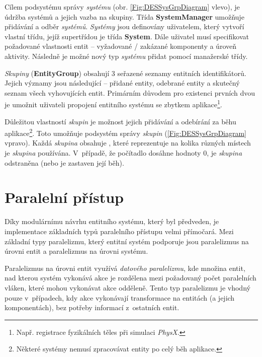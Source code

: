 Cílem podsystému správy \emph{systému} (obr. \ref{Fig:DESSysGrpDiagram} vlevo), je údržba systémů a jejich vazba na skupiny. Třída \textbf{SystemManager} umožňuje přidávání a odběr \emph{systémů}. \emph{Systémy} jsou definovány uživatelem, který vytvoří vlastní třídu, jejíž supertřídou je třída \textbf{System}. Dále uživatel musí specifikovat požadované vlastnosti entit -- vyžadované / zakázané komponenty a úroveň aktivity. Následně je možné nový typ \emph{systému} přidat pomocí manažerské třídy.

\emph{Skupiny} (\textbf{EntityGroup}) obsahují 3 seřazené seznamy entitních identifikátorů. Jejich významy jsou následující -- přidané entity, odebrané entity a skutečný seznam všech vyhovujících entit. Primárním důvodem pro existenci prvních dvou je umožnit uživateli propojení entitního systému se zbytkem aplikace\footnote{Např. registrace fyzikálních těles při simulaci \emph{PhysX}.}.

Důležitou vlastností \emph{skupin} je možnost jejich přidávání a odebírání za běhu aplikace\footnote{Některé systémy nemusí zpracovávat entity po celý běh aplikace.}. Toto umožňuje podsystém správy \emph{skupin} (\ref{Fig:DESSysGrpDiagram} vpravo). Každá \emph{skupina} obsahuje , které reprezentuje na kolika různých místech je \emph{skupina} používána. V~případě, že počítadlo dosáhne hodnoty 0, je \emph{skupina} odstraněna (nebo je zastaven její běh). 

\section{Paralelní přístup}

Díky modulárnímu návrhu entitního systému, který byl předveden, je implementace základních typů paralelního přístupu velmi přímočará. Mezi základní typy paralelizmu, který entitní systém podporuje jsou paralelizmus na úrovni entit a paralelizmus na úrovni systému.

Paralelizmus na úrovni entit využívá \emph{datového paralelizmu}, kde množina entit, nad kterou systém vykonává akce je rozdělena mezi požadovaný počet paralelních vláken, které mohou vykonávat akce odděleně. Tento typ paralelizmu je vhodný pouze v~případech, kdy akce vykonávají transformace na entitách (a jejich komponentách), bez potřeby informací z~ostatních entit. 

